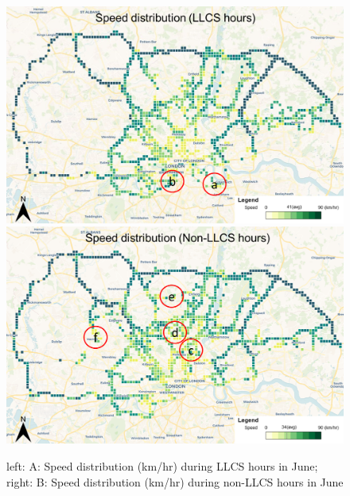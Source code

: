 \documentclass[preprint,12pt,3p]{elsarticle}
\begin{document}
\begin{figure}[h]          
    \mbox{\includegraphics[scale=0.78]{llcsspeed.png}}   
    \hspace{0.1px}
    \mbox{\includegraphics[scale=0.78]{nonllcsspeed.png}}
    \caption{left: A: Speed distribution (km/hr) during LLCS hours in June; right: B: Speed distribution (km/hr) during non-LLCS hours in June}
    \label{fig5}
\end{figure}
\end{document}
